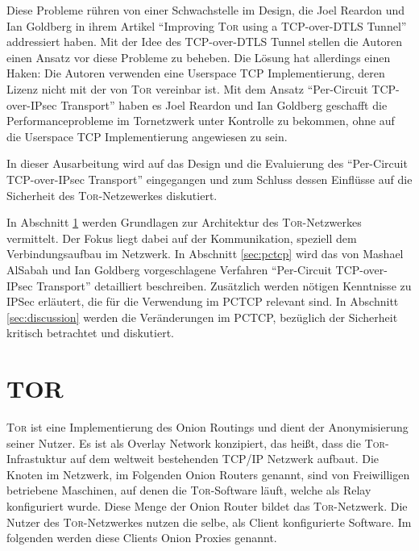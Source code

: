 \documentclass[fleqn,envcountsame,runningheads,10pt,a4paper]{llncs}
\begin{document}
Diese Probleme rühren von einer Schwachstelle im Design, die Joel Reardon und Ian Goldberg in ihrem Artikel ``Improving \textsc{Tor} using a TCP-over-DTLS Tunnel'' addressiert haben. Mit der Idee des TCP-over-DTLS Tunnel stellen die Autoren einen Ansatz vor diese Probleme zu beheben. Die Lösung hat allerdings einen Haken: Die Autoren verwenden eine Userspace TCP Implementierung, deren Lizenz nicht mit der von \textsc{Tor} vereinbar ist. Mit dem Ansatz ``Per-Circuit TCP-over-IPsec Transport'' haben es Joel Reardon und Ian Goldberg geschafft die Performanceprobleme im Tornetzwerk unter Kontrolle zu bekommen, ohne auf die Userspace TCP Implementierung angewiesen zu sein.

In dieser Ausarbeitung wird auf das Design und die Evaluierung des ``Per-Circuit TCP-over-IPsec Transport'' eingegangen und zum Schluss dessen Einflüsse auf die Sicherheit des \textsc{Tor}-Netzewerkes diskutiert.

In Abschnitt \ref{sec:tor} werden Grundlagen zur Architektur des \textsc{Tor}-Netzwerkes vermittelt.
Der Fokus liegt dabei auf der Kommunikation, speziell dem Verbindungsaufbau im Netzwerk.
In Abschnitt \ref{sec:pctcp} wird das von Mashael AlSabah und Ian Goldberg vorgeschlagene Verfahren ``Per-Circuit TCP-over-IPsec Transport'' detailliert beschreiben.
Zusätzlich werden nötigen Kenntnisse zu IPSec erläutert, die für die Verwendung im PCTCP relevant sind.
In Abschnitt \ref{sec:discussion} werden die Veränderungen im PCTCP, bezüglich der Sicherheit kritisch betrachtet und diskutiert.

\section{TOR}
\label{sec:tor}



\textsc{Tor} ist eine Implementierung des Onion Routings und dient der Anonymisierung seiner Nutzer.
Es ist als Overlay Network konzipiert, das heißt, dass die \textsc{Tor}-Infrastuktur auf dem weltweit bestehenden TCP/IP Netzwerk aufbaut.
Die Knoten im Netzwerk, im Folgenden Onion Routers genannt, sind von Freiwilligen betriebene Maschinen, auf denen die \textsc{Tor}-Software läuft, welche als Relay konfiguriert wurde.
Diese Menge der Onion Router bildet das \textsc{Tor}-Netzwerk.
Die Nutzer des \textsc{Tor}-Netzwerkes nutzen die selbe, als Client konfigurierte Software.
Im folgenden werden diese Clients Onion Proxies genannt.
\end{document}
